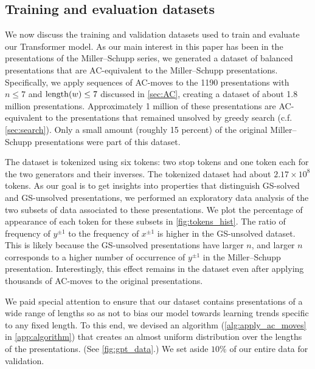 \subsection{Training and evaluation datasets\label{sec:transformer_datasets}}

We now discuss the training and validation datasets used to train and evaluate our Transformer model.
As our main interest in this paper has been in the presentations of the Miller--Schupp series, we generated a dataset of balanced presentations that are AC-equivalent to the Miller--Schupp presentations.
Specifically, we apply sequences of AC-moves to the 1190 presentations with $n \leq 7$ and $\operatorname{length}(w) \leq 7$ discussed in \cref{sec:AC}, creating a dataset of about 1.8 million presentations.
Approximately 1 million of these presentations are AC-equivalent to the presentations that remained unsolved by greedy search (c.f. \cref{sec:search}).
Only a small amount (roughly 15 percent) of the original Miller--Schupp presentations were part of this dataset.

The dataset is tokenized using six tokens: two stop tokens and one token each for the two generators and their inverses.
The tokenized dataset had about $2.17 \times 10^8$ tokens.
As our goal is to get insights into properties that distinguish GS-solved and GS-unsolved presentations, we performed an exploratory data analysis of the two subsets of data associated to these presentations.
We plot the percentage of appearance of each token for these subsets in \cref{fig:tokens_hist}.
The ratio of frequency of $y^{\pm 1}$ to the frequency of $x^{\pm 1}$ is higher in the GS-unsolved dataset.
This is likely because the GS-unsolved presentations have larger $n$, and larger $n$ corresponds to a higher number of occurrence of $y^{\pm 1}$ in the Miller--Schupp presentation.
Interestingly, this effect remains in the dataset even after applying thousands of AC-moves to the original presentations.

We paid special attention to ensure that our dataset contains presentations of a wide range of lengths so as not to bias our model towards learning trends specific to any fixed length.
To this end, we devised an algorithm (\cref{alg:apply_ac_moves} in \cref{app:algorithm}) that creates an almost uniform distribution over the lengths of the presentations.
(See \cref{fig:gpt_data}.) We set aside $10\%$ of our entire data for validation.

